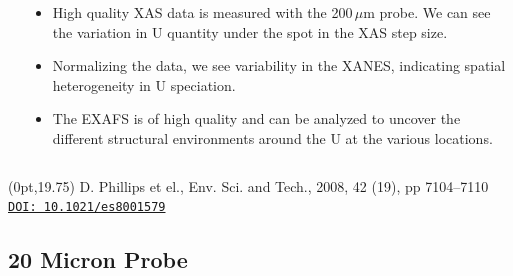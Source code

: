\documentclass[10pt, xcolor=x11names, compress]{beamer}
\begin{document}
\begin{frame}
\begin{columns}[T]
\begin{column}{0.34\linewidth}
    \end{column}
    \begin{column}{0.66\linewidth}
      \begin{itemize}[<+->]
      \item High quality XAS data is measured with the 200\,$\mu$m
        probe.  We can see the variation in U quantity under the spot
        in the XAS step size.\\[10ex]
      \item Normalizing the data, we see variability in the XANES,
        indicating spatial heterogeneity in U speciation.\\[10ex]
      \item The EXAFS is of high quality and can be analyzed to
        uncover the different structural environments around the U at
        the various locations.
      \end{itemize}
    \end{column}
  \end{columns}
  \begin{textblock*}{0.5\linewidth}(0pt,19.75\TPVertModule) \tiny
    D. Phillips et el., Env. Sci. and Tech., 2008, 42 (19), pp
    7104–7110
    \href{http://dx.doi.org/10.1021/es8001579}{\color{Blue4}\texttt{DOI:
        10.1021/es8001579}}
  \end{textblock*}
\end{frame}

\subsection[20 $\mu$m]{20 Micron Probe}
\end{document}
